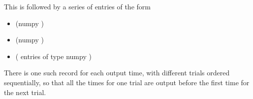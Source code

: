 \documentclass[letterpaper,10pt,english]{sphinxmanual}
\begin{document}
This is followed by a series of entries of the form
\begin{itemize}
\item {} 
 (numpy )

\item {} 
 (numpy )

\item {} 
 ( entries of type numpy )

\end{itemize}

There is one such record for each output time, with different trials
ordered sequentially, so that all the times for one trial are output
before the first time for the next trial.
\end{document}
